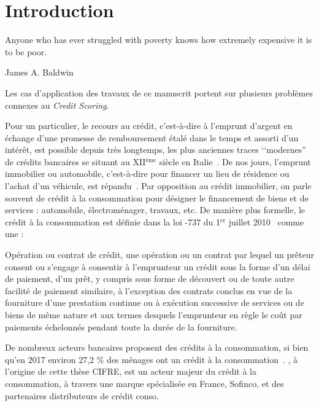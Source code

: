 \chapter*{\nmu Introduction} \label{chap_intro}

\epigraph{Anyone who has ever struggled with poverty knows how extremely expensive it is to be poor.}{James A. Baldwin}

Les cas d'application des travaux de ce manuscrit portent sur plusieurs problèmes connexes au \textit{Credit Scoring}.

Pour un particulier, le recours au crédit, c'est-à-dire à l'emprunt d'argent en échange d'une promesse de remboursement étalé dans le temps et assorti d'un intérêt, est possible depuis très longtemps, les plus anciennes traces ‘‘modernes'' de crédits bancaires se situant au XII$^\text{ème}$ siècle en Italie~\cite{thomas_wards_1828}. De nos jours, l'emprunt immobilier ou automobile, c'est-à-dire pour financer un lieu de résidence ou l'achat d'un véhicule, est répandu~\cite{la_tribune_2010}. Par opposition au crédit immobilier, on parle souvent de crédit à la consommation pour désigner le financement de biens et de services : automobile, électroménager, travaux, etc. De manière plus formelle, le crédit à la consommation est définie dans la loi -737 du 1$^\text{er}$ juillet 2010~\cite{noauthor_loi_2010} comme une :
\begin{displayquote}
Opération ou contrat de crédit, une opération ou un contrat par lequel un prêteur consent ou s’engage à consentir à l’emprunteur un crédit sous la forme d’un délai de paiement, d’un prêt, y compris sous forme de découvert ou de toute autre facilité de paiement similaire, à l’exception des contrats conclus en vue de la fourniture d’une prestation continue ou à exécution successive de services ou de biens de même nature et aux termes desquels l’emprunteur en règle le coût par paiements échelonnés pendant toute la durée de la fourniture.
\end{displayquote}

De nombreux acteurs bancaires proposent des crédits à la consommation, si bien qu'en 2017 environ 27,2 \% des ménages ont un crédit à la consommation~\cite{observatoire}. , à l'origine de cette thèse CIFRE, est un acteur majeur du crédit à la consommation, à travers une marque spécialisée en France, Sofinco, et des partenaires distributeurs de crédit conso.


